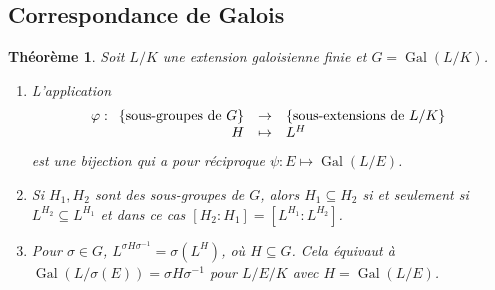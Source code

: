 \documentclass{article}
\DeclareMathOperator{\Gal}{Gal}
\newcommand{\applic}[4]{\begin{array}[t]{rcl}
#1 & \to & #2 \\
#3 & \mapsto & #4
\end{array}}
\theoremstyle{plain}
\newtheorem{theorem}{Théorème}[subsection]
\theoremstyle{definition}
\theoremstyle{remark}
\begin{document}
\subsection{Correspondance de Galois}

\begin{theorem}
    Soit $L/K$ une extension galoisienne finie et $G = \Gal(L/K)$.
    \begin{enumerate}
        \item L'application
        \[\varphi : \applic{\{\text{sous-groupes de $G$}\}}{\{\text{sous-extensions de $L/K$}\}}{H}{L^H}\]
        est une bijection qui a pour réciproque $\psi : E \mapsto \Gal(L/E)$.
        \item Si $H_1, H_2$ sont des sous-groupes de $G$, alors $H_1 \subseteq H_2$ si et seulement si $L^{H_2} \subseteq L^{H_1}$ et dans ce cas $[H_2 : H_1] = [L^{H_1} : L^{H_2}]$.
        \item Pour $\sigma \in G$, $L^{\sigma H \sigma^{-1}} = \sigma(L^H)$, où $H \subseteq G$. Cela équivaut à $\Gal(L/\sigma(E)) = \sigma H \sigma^{-1}$ pour $L/E/K$ avec $H = \Gal(L/E)$.
    \end{enumerate}
\end{theorem}
\end{document}
